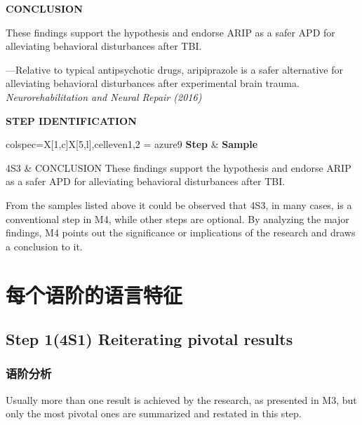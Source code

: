 \documentclass[a4paper]{ctexbook}
\begin{document}
\begin{sample}[label={myautocounter}]{\heiti}
  
  \textbf{CONCLUSION}
  
  These findings support the hypothesis and endorse ARIP as a safer APD for alleviating behavioral disturbances after TBI.


  \begin{flushright}
    ---Relative to typical antipsychotic drugs, aripiprazole is a safer alternative for alleviating behavioral disturbances after experimental brain trauma. \emph{Neurorehabilitation and Neural Repair (2016)}
  \end{flushright}

  \tcblower

  \noindent \textbf{STEP IDENTIFICATION}

  \vspace*{10pt}
  {\small\noindent
  \begin{tblr}{colspec={X[1,c]X[5,l]},cell{even}{1,2} = {azure9}}
    \toprule
    \textbf{Step} & \textbf{Sample} \\ 
    \midrule
  
    4S3 & CONCLUSION These findings support the hypothesis and endorse ARIP as a safer APD for alleviating behavioral disturbances after TBI.\\

    \bottomrule
  \end{tblr}
  }
  
\end{sample}

From the samples listed above it could be observed that 4S3, in many cases, is a conventional step in M4, while other steps are optional. By analyzing the major findings, M4 points out the significance or implications of the research and draws a conclusion to it.

\section{每个语阶的语言特征}
  \subsection{Step 1(4S1) Reiterating pivotal results}
    \subsubsection{语阶分析}

    Usually more than one result is achieved by the research, as presented in M3, but only the most pivotal ones are summarized and restated in this step.
\end{document}
